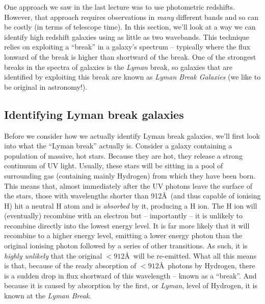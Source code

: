 \documentclass[11pt]{article}
\begin{document}
One approach we saw in the last lecture was to use photometric
redshifts. However, that approach requires observations in {\it many}
different bands and so can be costly (in terms of telescope time). In
this section, we'll look at a way we can identify high redshift
galaxies using as little as two wavebands. This technique relies on
exploiting a ``break'' in a galaxy's spectrum -- typically where the
flux lonward of the break is higher than shortward of the break. One
of the strongest breaks in the spectra of galaxies is the {\it Lyman}
break, so galaxies that are identified by exploiting this break are
known as {\it Lyman Break Galaxies} (we like to be original in astronomy!).

\subsection{Identifying Lyman break galaxies}
Before we consider how we actually identify Lyman break galaxies,
we'll first look into what the ``Lyman break'' actually is. Consider a
galaxy containing a population of massive, hot stars. Because they are
hot, they release a strong continuum of UV light. Usually, these stars
will be sitting in a pool of surrounding gas (containing mainly
Hydrogen) from which they have been born. This means that, almost
immediately after the UV photons leave the surface of the stars, those
with wavelengths shorter than 912\AA\ (and thus capable of ionising H)
hit a neutral H atom and is {\it absorbed} by it, producing a H ion. The H
ion will (eventually) recombine with an electron but -- importantly --
it is unlikely to recombine directly into the lowest energy level. It
is far more likely that it will recombine to a higher energy level,
emitting a lower energy photon than the original ionising photon followed
by a series of other transitions. As such, it is {\it highly unlikely}
that the original $<912$\AA\ will be re-emitted. What all this means is
that, because of the ready absorption of $<912$\AA\ photons by
Hydrogen, there is a sudden drop in flux shortward of this wavelength
-- known as a ``break''. And because it is caused by absorption by the
first, or {\it Lyman}, level of Hydrogen, it is known at the {\it Lyman
  Break}.
\end{document}
